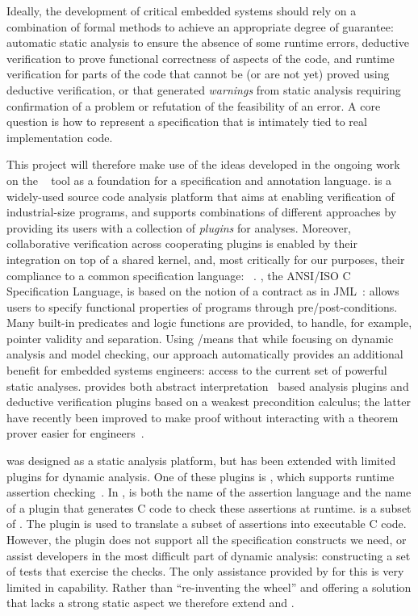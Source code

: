 Ideally, the development of critical embedded systems should rely on a combination of formal methods to achieve an appropriate degree of guarantee:
automatic static analysis to ensure the absence of some runtime errors,
deductive verification to prove functional correctness of aspects of the code,
and runtime verification for parts of the code that cannot be (or are not yet) proved using deductive verification,
or that generated \emph{warnings} from static analysis requiring confirmation of a problem or refutation of the feasibility of an error.  A core question is how to represent a specification that is intimately tied to real implementation code.  

This project will therefore make use of the ideas developed in the ongoing work on the \framac{}~\cite{KKP2015:FAC} tool as a foundation for a specification and annotation language.
\framac is a widely-used source code analysis platform that aims at enabling verification of industrial-size programs,
 and supports combinations of different approaches by providing its users with a collection of \emph{plugins} for analyses.
Moreover, collaborative verification across cooperating plugins is enabled by their integration on top of a shared kernel, and, most critically for our purposes, their compliance to a common specification language: \acsl~\cite{ACSL}.
\acsl, the ANSI/ISO C Specification Language, is based on the notion of a contract as in JML~\cite{jml}: \acsl allows users to specify functional properties of programs through pre/post-conditions.
Many built-in predicates and logic functions are provided, to handle, for example, pointer validity and separation.
Using \acsl/\framac means that while focusing on dynamic analysis and model checking, our approach automatically provides an additional benefit for embedded systems engineers: access to the current set of powerful \framac static analyses.  \framac provides both abstract interpretation~\cite{cousot77} based analysis plugins and deductive verification plugins based on a weakest precondition calculus; the latter have recently been improved to make proof without interacting with a theorem prover easier for engineers~\cite{BLK2019:NFM}.

\framac was designed as a static analysis platform, but has been extended with limited plugins for dynamic analysis.
One of these plugins is \eacsl, which supports runtime assertion checking~\cite{CR2006:SEN}.
In \framac, \eacsl is both the name of the assertion language and the name of a plugin that generates C code to check these assertions at runtime.
\eacsl is a subset of \acsl.  The plugin \eacsl is used to translate a subset of \framac assertions into executable C code.
However, the \eacsl plugin does not support all the specification constructs we need, or assist developers in the most difficult part of dynamic analysis:  constructing a set of tests that exercise the checks.  The only assistance provided by \framac for this is very limited in capability.  Rather than ``re-inventing the wheel'' and offering a solution that lacks a strong static aspect we therefore extend \acsl and \eacsl.